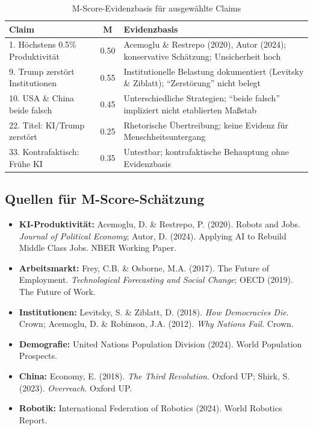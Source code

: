 \begin{table}[H]
\centering
\caption{M-Score-Evidenzbasis f\"ur ausgew\"ahlte Claims}
\footnotesize
\begin{tabular}{lcp{8cm}}
\toprule
\textbf{Claim} & \textbf{M} & \textbf{Evidenzbasis} \\
\midrule
1. H\"ochstens 0.5\% Produktivit\"at & 0.50 & Acemoglu \& Restrepo (2020), Autor (2024); konservative Sch\"atzung; Unsicherheit hoch \\
9. Trump zerst\"ort Institutionen & 0.55 & Institutionelle Belastung dokumentiert (Levitsky \& Ziblatt); ``Zerst\"orung'' nicht belegt \\
10. USA \& China beide falsch & 0.45 & Unterschiedliche Strategien; ``beide falsch'' impliziert nicht etablierten Ma{\ss}stab \\
22. Titel: KI/Trump zerst\"ort & 0.25 & Rhetorische \"Ubertreibung; keine Evidenz f\"ur Menschheitsuntergang \\
33. Kontrafaktisch: Fr\"uhe KI & 0.35 & Untestbar; kontrafaktische Behauptung ohne Evidenzbasis \\
\bottomrule
\end{tabular}
\end{table}


\subsection{Quellen f\"ur M-Score-Sch\"atzung}

\begin{itemize}
    \item \textbf{KI-Produktivit\"at:} Acemoglu, D. \& Restrepo, P. (2020). Robots and Jobs. \emph{Journal of Political Economy}; Autor, D. (2024). Applying AI to Rebuild Middle Class Jobs. NBER Working Paper.
    \item \textbf{Arbeitsmarkt:} Frey, C.B. \& Osborne, M.A. (2017). The Future of Employment. \emph{Technological Forecasting and Social Change}; OECD (2019). The Future of Work.
    \item \textbf{Institutionen:} Levitsky, S. \& Ziblatt, D. (2018). \emph{How Democracies Die}. Crown; Acemoglu, D. \& Robinson, J.A. (2012). \emph{Why Nations Fail}. Crown.
    \item \textbf{Demografie:} United Nations Population Division (2024). World Population Prospects.
    \item \textbf{China:} Economy, E. (2018). \emph{The Third Revolution}. Oxford UP; Shirk, S. (2023). \emph{Overreach}. Oxford UP.
    \item \textbf{Robotik:} International Federation of Robotics (2024). World Robotics Report.
\end{itemize}


